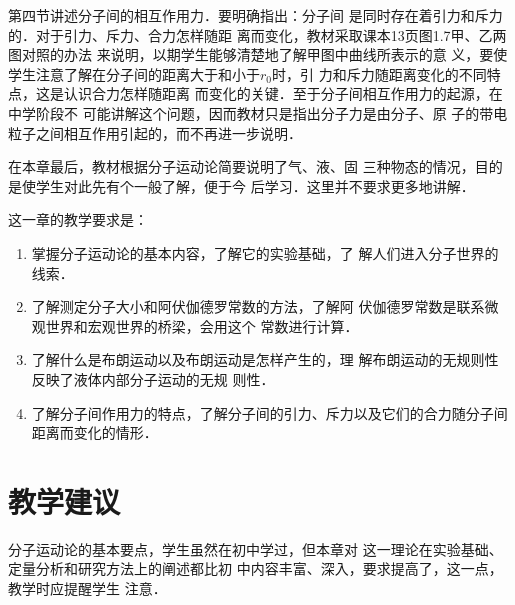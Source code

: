 第四节讲述分子间的相互作用力．要明确指出：分子间
是同时存在着引力和斥力的．对于引力、斥力、合力怎样随距
离而变化，教材采取课本13页图1.7甲、乙两图对照的办法
来说明，以期学生能够清楚地了解甲图中曲线所表示的意
义，要使学生注意了解在分子间的距离大于和小于$r_0$时，引
力和斥力随距离变化的不同特点，这是认识合力怎样随距离
而变化的关键．至于分子间相互作用力的起源，在中学阶段不
可能讲解这个问题，因而教材只是指出分子力是由分子、原
子的带电粒子之间相互作用引起的，而不再进一步说明．

在本章最后，教材根据分子运动论简要说明了气、液、固
三种物态的情况，目的是使学生对此先有个一般了解，便于今
后学习．这里并不要求更多地讲解．

这一章的教学要求是：

\begin{enumerate}
\item 掌握分子运动论的基本内容，了解它的实验基础，了
解人们进入分子世界的线索．
\item 了解测定分子大小和阿伏伽德罗常数的方法，了解阿
伏伽德罗常数是联系微观世界和宏观世界的桥梁，会用这个
常数进行计算．
\item 了解什么是布朗运动以及布朗运动是怎样产生的，理
解布朗运动的无规则性反映了液体内部分子运动的无规
则性．
\item 了解分子间作用力的特点，了解分子间的引力、斥力以及它们的合力随分子间距离而变化的情形．
\end{enumerate}

\section{教学建议}
分子运动论的基本要点，学生虽然在初中学过，但本章对
这一理论在实验基础、定量分析和研究方法上的阐述都比初
中内容丰富、深入，要求提高了，这一点，教学时应提醒学生
注意．

